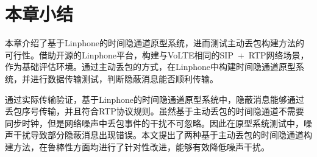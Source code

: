 \section{本章小结}
\label{chap:linphone:conclude}

本章介绍了基于Linphone的时间隐通道原型系统，进而测试主动丢包构建方法的可行性。借助开源的Linphone平台，构建与VoLTE相同的SIP\ +\ RTP网络场景，作为基础评估环境。通过主动丢包的方式，在Linphone中构建时间隐通道原型系统，并进行数据传输测试，判断隐蔽消息能否顺利传输。

通过实际传输验证，基于Linphone的时间隐通道原型系统中，隐蔽消息能够通过丢包序号传输，并且符合RTP协议规则。虽然基于主动丢包的时间隐通道不需要同步时钟，但是网络噪声中丢包事件的干扰不可忽略。因此在原型系统测试中，噪声干扰导致部分隐蔽消息出现错误。本文提出了两种基于主动丢包的时间隐通道构建方法，在鲁棒性方面均进行了针对性改进，能够有效降低噪声干扰。